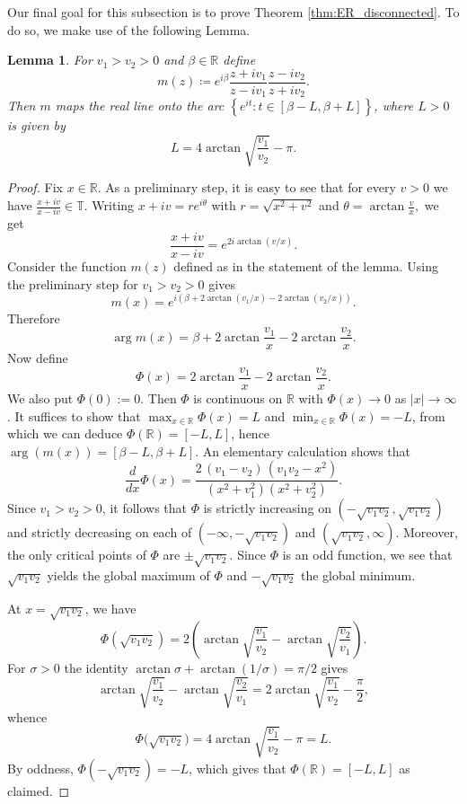 \documentclass[reqno,a4paper,11pt]{amsart}
\numberwithin{equation}{section}
\newtheorem{lemma}[definition]{Lemma}
\def\R{{\mathbb R}}
\def\T{{\mathbb T}}
\newcommand\1{\mathds{1}}
\begin{document}
Our final goal for this subsection is to prove Theorem \ref{thm:ER_disconnected}. To do so, we make use of the following Lemma.

\begin{lemma}\label{lma:real_line_onto_arc}
For $v_1 > v_2 > 0$ and $\beta \in \mathbb{R}$ define
$$
m(z) \coloneqq e^{i\beta} \frac{z + i v_1}{z - i v_1} \frac{z - i v_2}{z + i v_2}.
$$
Then $m$ maps the real line onto the arc $\left\{ e^{it}:  t\in[\beta-L,\beta+L] \right\}$, where $L>0$ is given by
$$
L = 4\arctan\sqrt{\frac{v_1}{v_2}}-\pi.
$$
\end{lemma}
\begin{proof}
    Fix $x \in \R$. As a preliminary step, it is easy to see that for every $v>0$ we have $\frac{x+iv}{x-iv}\in \T$. Writing $x + i v = r e^{i\theta}$ with $r = \sqrt{x^2 + v^2}$ and $\theta = \arctan \frac{v}{x},$ we get
$$
\frac{x + i v}{x - i v}
= e^{2 i \arctan(v/x)}.
$$
Consider the function $m(z)$ defined as in the statement of the lemma. Using the preliminary step for $v_1>v_2>0$ gives
$$
m(x)
= e^{i ( \beta + 2\arctan(v_1/x) - 2\arctan(v_2/x))}.
$$
Therefore
$$
\arg m(x)
= \beta
  + 2\arctan\!\frac{v_1}{x}
  - 2\arctan\!\frac{v_2}{x}.
$$
Now define
$$
\Phi(x) = 2\arctan\!\frac{v_1}{x}
  - 2\arctan\!\frac{v_2}{x}.
$$
We also put $\Phi(0):=0$. 
Then $\Phi$ is continuous on $\R$ with $\Phi(x) \to 0$ as $|x| \to \infty$. It suffices to show that $\max_{x\in \R}\Phi(x)=L$ and $\min_{x\in \R}\Phi(x)=-L$, from which we can deduce $\Phi(\R)=[-L,L]$, hence $\arg(m(x))=[\beta-L, \beta+L]$. An elementary calculation shows that
$$
\frac{d}{dx} \Phi(x) = \frac{2\,(v_1-v_2)\,(v_1 v_2 - x^2)}
{(x^2+v_1^2)(x^2+v_2^2)}.
$$
Since $v_1 > v_2 > 0$, it follows that $\Phi$ is strictly increasing on $(-\sqrt{v_1 v_2},\sqrt{v_1 v_2})$ and strictly decreasing on each of $(-\infty,-\sqrt{v_1 v_2})$ and $(\sqrt{v_1 v_2},\infty)$. Moreover, the only critical points of $\Phi$ are $\pm\sqrt{v_1 v_2}$. Since $\Phi$ is an odd function, we see that $\sqrt{v_1 v_2}$ yields the global maximum of $\Phi$ and $-\sqrt{v_1 v_2}$ the global minimum.

At $x=\sqrt{v_1 v_2}$, we have
$$
\Phi \left ( \sqrt{v_1 v_2} \right )
=2\left ( \arctan\sqrt{\frac{v_1}{v_2}}-\arctan\sqrt{\frac{v_2}{v_1}} \right ).
$$
For $\sigma>0$ the identity $\arctan \sigma+\arctan(1/\sigma)=\pi/2$ gives
$$
\arctan\sqrt{\frac{v_1}{v_2}}-\arctan\sqrt{\frac{v_2}{v_1}}
=2\arctan\sqrt{\frac{v_1}{v_2}}-\frac{\pi}{2},
$$
whence
$$
\Phi\bigl(\sqrt{v_1 v_2}\bigr)
=4\arctan\sqrt{\frac{v_1}{v_2}}-\pi
= L.
$$
By oddness, $\Phi(-\sqrt{v_1 v_2}) = -L$, which gives that $\Phi(\R)=[-L,L]$ as claimed.
\end{proof}
\end{document}

